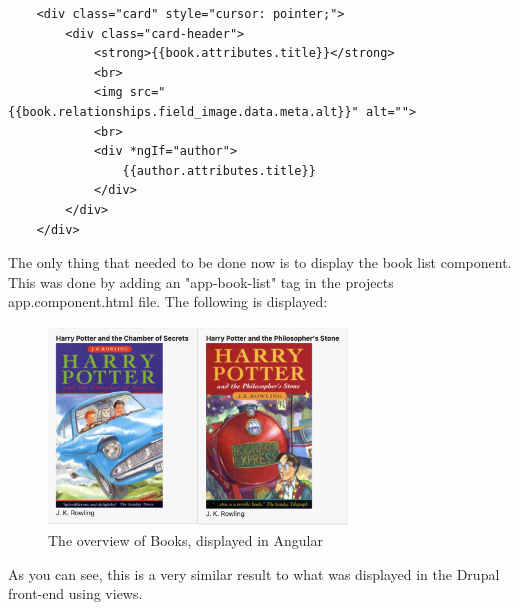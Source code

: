 \begin{lstlisting}
	<div class="card" style="cursor: pointer;">
		<div class="card-header">
			<strong>{{book.attributes.title}}</strong>
			<br>
			<img src="{{book.relationships.field_image.data.meta.alt}}" alt="">
			<br>
			<div *ngIf="author">
				{{author.attributes.title}}
			</div>
		</div>
	</div>
\end{lstlisting}

The only thing that needed to be done now is to display the book list component. This was done by adding an "app-book-list" tag in the projects app.component.html file. The following is displayed: 


\begin{figure}[h]
	\centering
	\includegraphics[width=8cm]{./img/Angular_Books.png}
	\caption[Display of a list of Books in Angular]{The overview of Books, displayed in Angular}
	\label{fig:BooksAngular}
\end{figure}

As you can see, this is a very similar result to what was displayed in the Drupal front-end using views.
